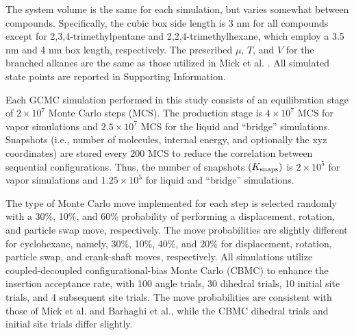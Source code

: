 \documentclass[journal=jced,manuscript=article]{achemso}
\begin{document}
The system volume is the same for each simulation, but varies somewhat between compounds. Specifically, the cubic box side length is 3 nm for all compounds except for 2,3,4-trimethylpentane and 2,2,4-trimethylhexane, which employ a 3.5 nm and 4 nm box length, respectively. The prescribed $\mu$, $T$, and $V$ for the branched alkanes are the same as those utilized in Mick et al. \cite{Potoff_branched}. All simulated state points are reported in Supporting Information. 


Each GCMC simulation performed in this study consists of an equilibration stage of $2 \times 10^7$ Monte Carlo steps (MCS). The production stage is $4 \times 10^7$ MCS for vapor simulations and $2.5 \times 10^7$ MCS for the liquid and ``bridge'' simulations. Snapshots (i.e., number of molecules, internal energy, and optionally the xyz coordinates) are stored every 200 MCS to reduce the correlation between sequential configurations. Thus, the number of snapshots $(K_{\rm snaps})$ is $2 \times 10^5$ for vapor simulations and $1.25 \times 10^5$ for liquid and ``bridge'' simulations. 

The type of Monte Carlo move implemented for each step is selected randomly with a 30\%, 10\%, and 60\% probability of performing a displacement, rotation, and particle swap move, respectively. The move probabilities are slightly different for cyclohexane, namely, 30\%, 10\%, 40\%, and 20\% for displacement, rotation, particle swap, and crank-shaft moves, respectively. All simulations utilize coupled-decoupled configurational-bias Monte Carlo (CBMC) to enhance the insertion acceptance rate, with 100 angle trials, 30 dihedral trials, 10 initial site trials, and 4 subsequent site trials. The move probabilities are consistent with those of Mick et al. and Barhaghi et al., while the CBMC dihedral trials and initial site trials differ slightly.


\end{document}
